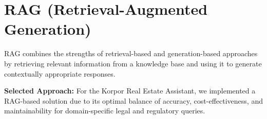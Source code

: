\section*{RAG (Retrieval-Augmented Generation)}

RAG combines the strengths of retrieval-based and generation-based approaches by retrieving relevant information from a knowledge base and using it to generate contextually appropriate responses.

\textbf{Selected Approach:} For the Korpor Real Estate Assistant, we implemented a RAG-based solution due to its optimal balance of accuracy, cost-effectiveness, and maintainability for domain-specific legal and regulatory queries.

\cleardoublepage
\pagestyle{empty} %
\renewcommand{\bibname}{Bibliography}
